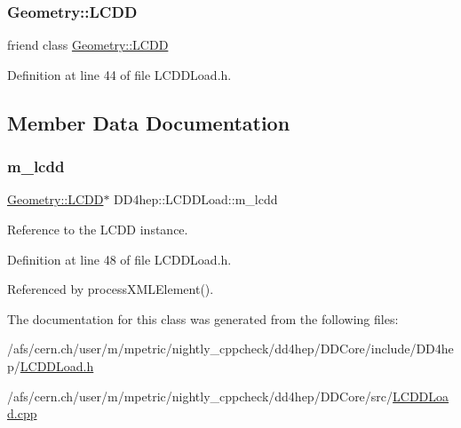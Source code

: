 \subsubsection{\texorpdfstring{Geometry\+::\+L\+C\+DD}{Geometry::LCDD}}
{\footnotesize\ttfamily friend class \hyperlink{class_d_d4hep_1_1_geometry_1_1_l_c_d_d}{Geometry\+::\+L\+C\+DD}\hspace{0.3cm}{\ttfamily [friend]}}



Definition at line 44 of file L\+C\+D\+D\+Load.\+h.



\subsection{Member Data Documentation}
\hypertarget{class_d_d4hep_1_1_l_c_d_d_load_a6420b6f11b8ee02144ef00bbeda63737}{}\label{class_d_d4hep_1_1_l_c_d_d_load_a6420b6f11b8ee02144ef00bbeda63737} 
\subsubsection{\texorpdfstring{m\+\_\+lcdd}{m\_lcdd}}
{\footnotesize\ttfamily \hyperlink{class_d_d4hep_1_1_geometry_1_1_l_c_d_d}{Geometry\+::\+L\+C\+DD}$\ast$ D\+D4hep\+::\+L\+C\+D\+D\+Load\+::m\+\_\+lcdd\hspace{0.3cm}{\ttfamily [protected]}}



Reference to the L\+C\+DD instance. 



Definition at line 48 of file L\+C\+D\+D\+Load.\+h.



Referenced by process\+X\+M\+L\+Element().



The documentation for this class was generated from the following files\+:\begin{DoxyCompactItemize}
\item 
/afs/cern.\+ch/user/m/mpetric/nightly\+\_\+cppcheck/dd4hep/\+D\+D\+Core/include/\+D\+D4hep/\hyperlink{_l_c_d_d_load_8h}{L\+C\+D\+D\+Load.\+h}\item 
/afs/cern.\+ch/user/m/mpetric/nightly\+\_\+cppcheck/dd4hep/\+D\+D\+Core/src/\hyperlink{_l_c_d_d_load_8cpp}{L\+C\+D\+D\+Load.\+cpp}\end{DoxyCompactItemize}
